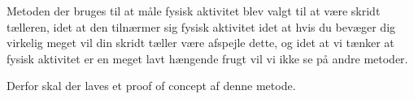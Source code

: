 Metoden der bruges til at måle fysisk aktivitet blev valgt til at være skridt tælleren, idet at den tilnærmer sig fysisk aktivitet idet at hvis du bevæger dig virkelig meget vil din skridt tæller være afspejle dette, og idet at vi tænker at fysisk aktivitet er en meget lavt hængende frugt vil vi ikke se på andre metoder. 

Derfor skal der laves et proof of concept af denne metode. 